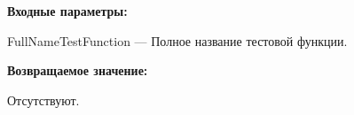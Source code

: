 \textbf{Входные параметры:}

FullNameTestFunction --- Полное название тестовой функции.

\textbf{Возвращаемое значение:}

Отсутствуют.